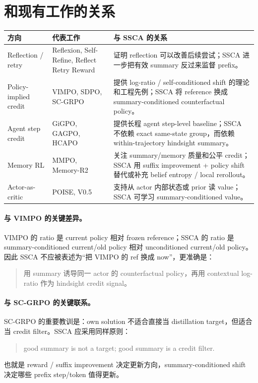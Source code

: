 \documentclass[10pt]{ctexart}
\begin{document}
\section{和现有工作的关系}
\begin{center}
\begin{tabularx}{\linewidth}{lXX}
\toprule
方向 & 代表工作 & 与 SSCA 的关系 \\
\midrule
Reflection / retry & Reflexion, Self-Refine, Reflect Retry Reward & 证明 reflection 可以改善后续尝试；SSCA 进一步把有效 summary 反过来监督 prefix。 \\
Policy-implied credit & VIMPO, SDPO, SC-GRPO & 提供 log-ratio / self-conditioned shift 的理论和工程先例；SSCA 将 reference 换成 summary-conditioned counterfactual policy。 \\
Agent step credit & GiGPO, GAGPO, HCAPO & 提供长程 agent step-level baseline；SSCA 不依赖 exact same-state group，而依赖 within-trajectory hindsight summary。 \\
Memory RL & MMPO, Memory-R2 & 关注 summary/memory 质量和公平 credit；SSCA 用 suffix improvement + policy shift 替代或补充 belief entropy / local rerollout。 \\
Actor-as-critic & POISE, V0.5 & 支持从 actor 内部状态或 prior 读 value；SSCA 可学习 summary-conditioned value。 \\
\bottomrule
\end{tabularx}
\end{center}

\paragraph{与 VIMPO 的关键差异。}
VIMPO 的 ratio 是 current policy 相对 frozen reference；SSCA 的 ratio 是 summary-conditioned current/old policy 相对 unconditioned current/old policy。因此 SSCA 不应被表述为“把 VIMPO 的 ref 换成 now”，更准确是：
\begin{quote}
用 summary 诱导同一 actor 的 counterfactual policy，再用 contextual log-ratio 作为 hindsight credit signal。
\end{quote}

\paragraph{与 SC-GRPO 的关键联系。}
SC-GRPO 的重要教训是：own solution 不适合直接当 distillation target，但适合当 credit filter。SSCA 应采用同样原则：
\begin{quote}
good summary is not a target; good summary is a credit filter.
\end{quote}
也就是 reward / suffix improvement 决定更新方向，summary-conditioned shift 决定哪些 prefix step/token 值得更新。
\end{document}
